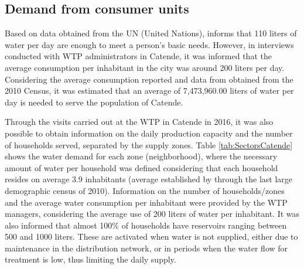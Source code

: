 \documentclass{singlecol}
\theoremstyle{TH}{
\newtheorem{lemma}{Lemma}
\newtheorem{theorem}[lemma]{Theorem}
\newtheorem{corrolary}[lemma]{Corrolary}
\newtheorem{conjecture}[lemma]{Conjecture}
\newtheorem{proposition}[lemma]{Proposition}
\newtheorem{claim}[lemma]{Claim}
\newtheorem{stheorem}[lemma]{Wrong Theorem}
\newtheorem{algorithm}{Algorithm}
}
\theoremstyle{THrm}{
\newtheorem{definition}{Definition}[section]
\newtheorem{question}{Question}[section]
\newtheorem{remark}{Remark}
\newtheorem{scheme}{Scheme}
}
\theoremstyle{THhit}{
\newtheorem{case}{Case}[section]
}
\begin{document}
\subsection{Demand from consumer units}

Based on data obtained from the UN (United Nations), \cite{Paganine2013} informs that 110 liters of water per day are enough to meet a person's basic needs. However, in interviews conducted with WTP administrators in Catende, it was informed that the average consumption per inhabitant in the city was around 200 liters per day. Considering the average consumption reported and data from \cite{IBGECatende} obtained from the 2010 Census, it was estimated that an average of 7,473,960.00 liters of water per day is needed to serve the population of Catende. 

Through the visits carried out at the WTP in Catende in 2016, it was also possible to obtain information on the daily production capacity and the number of households served, separated by the supply zones. Table \ref{tab:SectorsCatende} shows the water demand for each zone (neighborhood), where the necessary amount of water per household was defined considering that each household resides on average 3.9 inhabitants (average established by \cite{IBGECatende} through the last large demographic census of 2010). Information on the number of households/zones and the average water consumption per inhabitant were provided by the WTP managers, considering the average use of 200 liters of water per inhabitant. It was also informed that almost 100\% of households have reservoirs ranging between 500 and 1000 liters. These are activated when water is not supplied, either due to maintenance in the distribution network, or in periods when the water flow for treatment is low, thus limiting the daily supply. 
\end{document}
